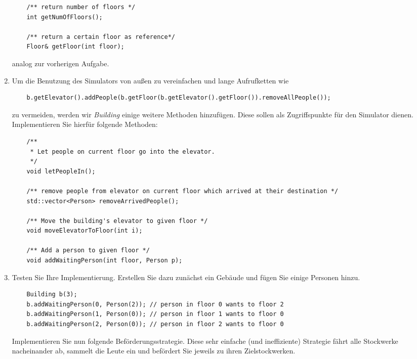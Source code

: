\documentclass[
  accentcolor=tud1c,	%
  colorbacktitle,		%
  inverttitle,			%
  german,				%
  twoside
]{tudexercise}
\begin{document}
\begin{enumerate}
\begin{lstlisting}
	/** return number of floors */
	int getNumOfFloors();
	
	/** return a certain floor as reference*/
	Floor& getFloor(int floor);
\end{lstlisting}

analog zur vorherigen Aufgabe.

\item 
Um die Benutzung des Simulators von außen zu vereinfachen und lange Aufrufketten wie
\begin{lstlisting}
	b.getElevator().addPeople(b.getFloor(b.getElevator().getFloor()).removeAllPeople());
\end{lstlisting} 

zu vermeiden, werden wir \emph{Building} einige weitere Methoden hinzufügen. Diese sollen als Zugriffspunkte für den Simulator dienen. Implementieren Sie hierfür folgende Methoden:

\begin{lstlisting}
	/** 
	 * Let people on current floor go into the elevator.
	 */
	void letPeopleIn();
	
	/** remove people from elevator on current floor which arrived at their destination */
	std::vector<Person> removeArrivedPeople();
	
	/** Move the building's elevator to given floor */
	void moveElevatorToFloor(int i);
	
	/** Add a person to given floor */
	void addWaitingPerson(int floor, Person p);
\end{lstlisting}	

\item
Testen Sie Ihre Implementierung. Erstellen Sie dazu zunächst ein Gebäude und fügen Sie einige Personen hinzu.

\begin{lstlisting}
	Building b(3);
	b.addWaitingPerson(0, Person(2)); // person in floor 0 wants to floor 2
	b.addWaitingPerson(1, Person(0)); // person in floor 1 wants to floor 0
	b.addWaitingPerson(2, Person(0)); // person in floor 2 wants to floor 0
\end{lstlisting}

Implementieren Sie nun folgende Beförderungsstrategie. Diese sehr einfache (und ineffiziente) Strategie fährt alle Stockwerke nacheinander ab, sammelt die Leute ein und befördert Sie jeweils zu ihren Zielstockwerken.

\begin{algorithm}[H]
 \SetAlgoLined
\end{algorithm}
\end{enumerate}
\end{document}
